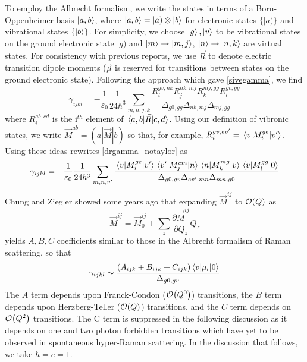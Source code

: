 \documentclass[aip, jcp, reprint, onecolumn]{revtex4-2}
\begin{document}
To employ the Albrecht formalism, we write the states in terms of a Born-Oppenheimer basis $\ket{a,b}$, where $\ket{a,b} = |a) \otimes \ket{b}$ for electronic states $\{|a)\}$ and vibrational states $\{\ket{b}\}$. \cite{BornOppenheimer, Albrecht1960}
For simplicity, we choose $\ket{g}, \ket{v}$ to be vibrational states on the ground electronic state $|g)$ and $\ket{m} \rightarrow \ket{m,j}$, $\ket{n} \rightarrow \ket{n,k}$ are virtual states.
For consistency with previous reports, we use $\vec{R}$ to denote electric transition dipole moments ($\vec{\mu}$ is reserved for transitions between states on the ground electronic state). \cite{Ziegler1974}
Following the approach which gave \autoref{sivegamma}, we find
\begin{equation}\label{drgamma_notaylor}
	\gamma_{ijkl} = -\frac{1}{\varepsilon_0} \frac{1}{24 \hbar^3} \sum_{m,n,j,k} \frac{
		R_{i}^{gv, nk} 
		R_{j}^{nk,mj} 
		R_{k}^{mj,gg} 
		R_{l}^{gv,gg} 
	}{\Delta_{g0,gg}
		\Delta_{nk, mj}
		\Delta_{mj, gg}
	}
\end{equation}
where $R_{i}^{ab,cd}$ is the i$^{th}$ element of $\mel{a,b}{\vec{R}}{c,d}$.\cite{Ziegler1988}
Using our definition of vibronic states, we write $\vec{M}^{ab} = (a|\vec{M}|b)$ so that, for example,
$R_{i}^{gv,ev'} = \mel{v}{M_i^{ge}}{v'}$.\cite{Albrecht1960}
Using these ideas rewrites \autoref{drgamma_notaylor} as
\begin{equation}\label{drgamma_notaylor_1}
	\begin{split}
		\gamma_{ijkl} &= -\frac{1}{\varepsilon_0} \frac{1}{24 \hbar^3} \sum_{m,n,v'} \frac{
			\mel{v}{M_{i}^{ge}}{v'} 
			\mel{v'}{M_{j}^{em}}{n}
			\mel{n}{M_{k}^{mg} }{v}
			\mel{v}{M_{l}^{gg}}{0}
		}{\Delta_{g0,gv}
			\Delta_{ev', mn}
			\Delta_{mn, g0}	} \\
	\end{split}
\end{equation}
Chung and Ziegler showed some years ago that expanding $\vec{M}^{ij}$ to $\order{Q}$ as
\begin{equation}
\vec{M}^{ij} = \vec{M}^{ij}_0 + \sum_z \frac{\partial\vec{M}^{ij}}{\partial Q_z} Q_z
\end{equation} 
yields $A, B, C$ coefficients similar to those in the Albrecht formalism of Raman scattering, \cite{Albrecht1961, Ziegler1988} so that
\begin{equation}
		\gamma_{ijkl} \sim \frac{(A_{ijk} + B_{ijk} + C_{ijk})\mel{v}{\mu_{l}}{0}} {\Delta_{g0,gv}}
\end{equation}
The $A$ term depends upon Franck-Condon ($\order{Q^0}$) transitions, the $B$ term depends upon Herzberg-Teller ($\order{Q}$) transitions, and the $C$ term depends on $\order{Q^2}$ transitions. 
The C term is suppressed in the following discussion as it depends on one and two photon forbidden transitions which have yet to be observed in spontaneous hyper-Raman scattering. \cite{Ziegler1988}
In the discussion that follows, we take $\hbar = e = 1$.
\end{document}
